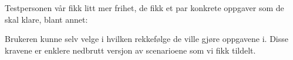Testpersonen vår fikk litt mer frihet, de fikk et par konkrete oppgaver som de skal klare, blant annet: 

Brukeren kunne selv velge i hvilken rekkefølge de ville gjøre oppgavene i. Disse kravene er enklere nedbrutt versjon av scenarioene som vi fikk tildelt. 
